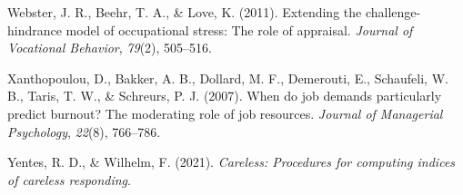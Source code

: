 \documentclass[
  man,mask]{apa7}
\newlength{\cslhangindent}
\newlength{\cslentryspacingunit} %
\newenvironment{CSLReferences}[2] %
 {%
  \setlength{\parindent}{0pt}
  \ifodd #1
  \let\oldpar\par
  \def\par{\hangindent=\cslhangindent\oldpar}
  \fi
  \setlength{\parskip}{#2\cslentryspacingunit}
 }%
 {}
\begin{document}
\begin{CSLReferences}{1}{0}
\leavevmode{}%
Webster, J. R., Beehr, T. A., \& Love, K. (2011). Extending the challenge-hindrance model of occupational stress: The role of appraisal. \emph{Journal of Vocational Behavior}, \emph{79}(2), 505--516.

\leavevmode{}%
Xanthopoulou, D., Bakker, A. B., Dollard, M. F., Demerouti, E., Schaufeli, W. B., Taris, T. W., \& Schreurs, P. J. (2007). When do job demands particularly predict burnout? The moderating role of job resources. \emph{Journal of Managerial Psychology}, \emph{22}(8), 766--786.

\leavevmode{}%
Yentes, R. D., \& Wilhelm, F. (2021). \emph{Careless: Procedures for computing indices of careless responding}.

\end{CSLReferences}

\endgroup
\end{document}
